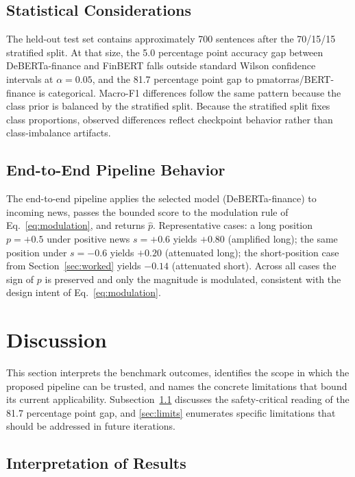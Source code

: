 \documentclass[conference]{IEEEtran}
\begin{document}
\subsection{Statistical Considerations}
\label{sec:stats}

The held-out test set contains approximately 700 sentences after the 70/15/15
stratified split. At that size, the 5.0 percentage point accuracy gap between
DeBERTa-finance and FinBERT falls outside standard Wilson confidence
intervals at $\alpha = 0.05$, and the 81.7 percentage point gap to
pmatorras/BERT-finance is categorical. Macro-F1 differences follow the same
pattern because the class prior is balanced by the stratified split. Because
the stratified split fixes class proportions, observed differences reflect
checkpoint behavior rather than class-imbalance artifacts.

\subsection{End-to-End Pipeline Behavior}
\label{sec:e2e}

The end-to-end pipeline applies the selected model (DeBERTa-finance) to
incoming news, passes the bounded score to the modulation rule of
Eq.~\eqref{eq:modulation}, and returns $\hat{p}$. Representative cases: a
long position $p = +0.5$ under positive news $s = +0.6$ yields $+0.80$
(amplified long); the same position under $s = -0.6$ yields $+0.20$
(attenuated long); the short-position case from Section~\ref{sec:worked}
yields $-0.14$ (attenuated short). Across all cases the sign of $p$ is
preserved and only the magnitude is modulated, consistent with the design
intent of Eq.~\eqref{eq:modulation}.

\section{Discussion}

This section interprets the benchmark outcomes, identifies the scope in which
the proposed pipeline can be trusted, and names the concrete limitations that
bound its current applicability. Subsection~\ref{sec:interp} discusses the
safety-critical reading of the 81.7 percentage point gap, and
\ref{sec:limits} enumerates specific limitations that should be addressed in
future iterations.

\subsection{Interpretation of Results}
\label{sec:interp}
\end{document}
